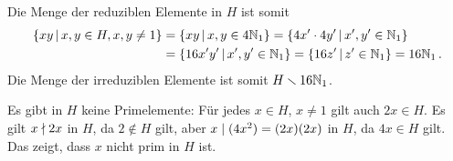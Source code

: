 Die Menge der reduziblen Elemente in $H$ ist somit
\begin{align*}
      \{ xy \suchthat x, y \in H, x, y \neq 1 \}
  &=  \{ xy \suchthat x, y \in 4 \Natural_1 \}
   =  \{ 4x' \cdot 4y' \suchthat x', y' \in \Natural_1 \} \\
  &=  \{ 16x'y' \suchthat x', y' \in \Natural_1 \}
   =  \{ 16z' \suchthat z' \in \Natural_1\}
   =  16 \Natural_1 \,.
\end{align*}
Die Menge der irreduziblen Elemente ist somit $H \smallsetminus 16 \mathbb{N}_1$.

Es gibt in $H$ keine Primelemente:
Für jedes $x \in H$, $x \neq 1$ gilt auch $2x \in H$.
Es gilt $x \mathrel{\nmid} 2x$ in $H$, da $2 \notin H$ gilt, aber $x \mathrel{|} (4x^2) = (2x)(2x)$ in $H$, da $4x \in H$ gilt.
Das zeigt, dass $x$ nicht prim in $H$ ist.









